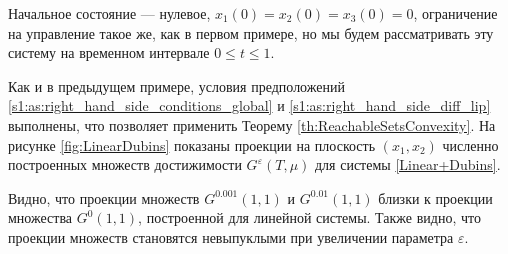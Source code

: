\documentclass[../main.tex]{subfiles}
\begin{document}
 Начальное состояние --- нулевое, $x_1(0) = x_2(0) = x_3(0) = 0$, ограничение на управление такое же, как в первом примере, но мы будем рассматривать эту систему на временном интервале $0 \leqslant t \leqslant 1$.
 
 Как и в предыдущем примере, условия предположений \ref{s1:as:right_hand_side_conditions_global} и \ref{s1:as:right_hand_side_diff_lip} выполнены, что позволяет применить Теорему \ref{th:ReachableSetsConvexity}. 
 На рисунке \ref{fig:LinearDubins} показаны проекции на плоскость $(x_1,x_2)$ численно построенных множеств достижимости $G^{\varepsilon}(T,\mu)$ для системы \eqref{Linear+Dubins}. 
 
 Видно, что проекции множеств $G^{0.001}(1,1) $ и $G^{0.01}(1,1) $ близки к проекции множества $G^{0}(1,1) $, построенной для линейной системы. 
 Также видно, что проекции множеств становятся невыпуклыми при увеличении параметра $\varepsilon$. 
\end{document}
